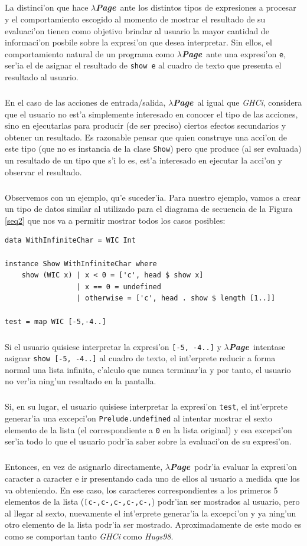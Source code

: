 \documentclass[a4paper]{article}
\newcommand{\hpage}{\textbf{\textsl{$\lambda$Page}}}
\begin{document}
\subparagraph{}La distinci'on que hace \hpage\ ante los distintos tipos de expresiones  a procesar y el comportamiento escogido al momento de mostrar el resultado de su evaluaci'on tienen como objetivo brindar al usuario la mayor cantidad de informaci'on posbile sobre la expresi'on que desea interpretar.  Sin ellos, el comportamiento natural de un programa como \hpage\ ante una expresi'on \texttt{e}, ser'ia el de asignar el resultado de \texttt{show e} al cuadro de texto que presenta el resultado al usuario.
\subparagraph{}En el caso de las acciones de entrada/salida, \hpage\ al igual que \textsl{GHCi}, considera que el usuario no est'a simplemente interesado en conocer el tipo de las acciones, sino en ejecutarlas para producir (de ser preciso) ciertos efectos secundarios y obtener un resultado.  Es razonable pensar que quien construye una acci'on de este tipo (que no es instancia de la clase \texttt{Show}) pero que produce (al ser evaluada) un resultado de un tipo que s'i lo es, est'a interesado en ejecutar la acci'on y observar el resultado.
\subparagraph{}Observemos con un ejemplo, qu'e suceder'ia.  Para nuestro ejemplo, vamos a crear un tipo de datos similar al utilizado para el diagrama de secuencia de la Figura \ref{seq2} que nos va a permitir mostrar todos los casos posibles:
\begin{center}\begin{lstlisting}
data WithInfiniteChar = WIC Int

instance Show WithInfiniteChar where
    show (WIC x) | x < 0 = ['c', head $ show x]
			  	 | x == 0 = undefined
			  	 | otherwise = ['c', head . show $ length [1..]]

test = map WIC [-5,-4..]
\end{lstlisting}\end{center}
\subparagraph{}Si el usuario quisiese interpretar la expresi'on \texttt{[-5, -4..]} y \hpage\ intentase asignar \texttt{show [-5, -4..]} al cuadro de texto, el int'erprete reducir a forma normal una lista infinita, c'alculo que nunca terminar'ia y por tanto, el usuario no ver'ia ning'un resultado en la pantalla.
\subparagraph{}Si, en su lugar, el usuario quisiese interpretar la expresi'on \texttt{test}, el int'erprete generar'ia una excepci'on \texttt{Prelude.undefined} al intentar mostrar el sexto elemento de la lista (el correspondiente a \texttt{0} en la lista original) y esa excepci'on ser'ia todo lo que el usuario podr'ia saber sobre la evaluaci'on de su expresi'on.
\subparagraph{}Entonces, en vez de asignarlo directamente, \hpage\ podr'ia evaluar la expresi'on caracter a caracter e ir presentando cada uno de ellos al usuario a medida que los va obteniendo.  En ese caso, los caracteres correspondientes a los primeros 5 elementos de la lista (\texttt{[c-,c-,c-,c-,c-,}) podr'ian ser mostrados al usuario, pero al llegar al sexto, nuevamente el int'erprete generar'ia la excepci'on y ya ning'un otro elemento de la lista podr'ia ser mostrado.  Aproximadamente de este modo es como se comportan tanto \textsl{GHCi} como \textsl{Hugs98}.
\end{document}
